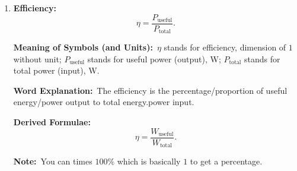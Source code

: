 \documentclass[8pt]{article}
\newcommand{\MeanSymb}{\textbf{Meaning of Symbols (and Units):}\ }
\newcommand{\WordExpl}{\textbf{Word Explanation:}\ }
\newcommand{\DeriForm}{\textbf{Derived Formulae:}\ }
\newcommand{\Note}{\textbf{Note:}\ }
\begin{document}
\begin{enumerate}
                \Note This formula also works for electrical power.

                \item \textbf{Efficiency:}
                \[
                    \eta = \frac{P_{\text{useful}}}{P_{\text{total}}}.
                \]

                \MeanSymb \(\eta\) stands for efficiency, dimension of \(1\) without unit; \(P_{\text{useful}}\) stands for useful power (output), \unit{\watt}; \(P_{\text{total}}\) stands for total power (input), \unit{\watt}.

                \WordExpl The efficiency is the percentage/proportion of useful energy/power output to total energy.power input.

                \DeriForm
                \[
                    \eta = \frac{W_{\text{useful}}}{W_{\text{total}}}.
                \]

                \Note You can times \(100\%\) which is basically \(1\) to get a percentage.

            \end{enumerate}
\end{document}
